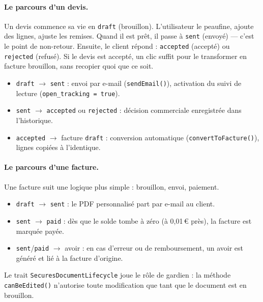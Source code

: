 \documentclass[12pt,a4paper]{report}
\begin{document}
\paragraph{Le parcours d'un devis.} Un devis commence sa vie en \texttt{draft} (brouillon). L'utilisateur le peaufine, ajoute des lignes, ajuste les remises. Quand il est prêt, il passe à \texttt{sent} (envoyé) --- c'est le point de non-retour. Ensuite, le client répond : \texttt{accepted} (accepté) ou \texttt{rejected} (refusé). Si le devis est accepté, un clic suffit pour le transformer en facture brouillon, sans recopier quoi que ce soit.
\begin{itemize}[leftmargin=*]
    \item \texttt{draft} $\rightarrow$ \texttt{sent} : envoi par e-mail (\texttt{sendEmail()}), activation du suivi de lecture (\texttt{open\_tracking = true}).
    \item \texttt{sent} $\rightarrow$ \texttt{accepted} ou \texttt{rejected} : décision commerciale enregistrée dans l'historique.
    \item \texttt{accepted} $\rightarrow$ facture \texttt{draft} : conversion automatique (\texttt{convertToFacture()}), lignes copiées à l'identique.
\end{itemize}

\paragraph{Le parcours d'une facture.} Une facture suit une logique plus simple : brouillon, envoi, paiement.
\begin{itemize}[leftmargin=*]
    \item \texttt{draft} $\rightarrow$ \texttt{sent} : le PDF personnalisé part par e-mail au client.
    \item \texttt{sent} $\rightarrow$ \texttt{paid} : dès que le solde tombe à zéro (à 0{,}01\,€ près), la facture est marquée payée.
    \item \texttt{sent}/\texttt{paid} $\rightarrow$ avoir : en cas d'erreur ou de remboursement, un avoir est généré et lié à la facture d'origine.
\end{itemize}

Le trait \texttt{SecuresDocumentLifecycle} joue le rôle de gardien : la méthode \texttt{canBeEdited()} n'autorise toute modification que tant que le document est en brouillon.
\end{document}
